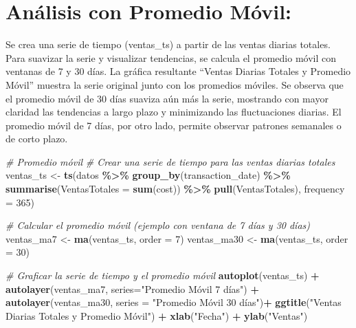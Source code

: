 \documentclass[
]{book}
\newenvironment{Shaded}{\begin{snugshade}}{\end{snugshade}}
\newcommand{\AttributeTok}[1]{\textcolor[rgb]{0.13,0.29,0.53}{#1}}
\newcommand{\CommentTok}[1]{\textcolor[rgb]{0.56,0.35,0.01}{\textit{#1}}}
\newcommand{\DecValTok}[1]{\textcolor[rgb]{0.00,0.00,0.81}{#1}}
\newcommand{\FunctionTok}[1]{\textcolor[rgb]{0.13,0.29,0.53}{\textbf{#1}}}
\newcommand{\NormalTok}[1]{#1}
\newcommand{\OtherTok}[1]{\textcolor[rgb]{0.56,0.35,0.01}{#1}}
\newcommand{\SpecialCharTok}[1]{\textcolor[rgb]{0.81,0.36,0.00}{\textbf{#1}}}
\newcommand{\StringTok}[1]{\textcolor[rgb]{0.31,0.60,0.02}{#1}}
\begin{document}
\section{Análisis con Promedio Móvil:}\label{anuxe1lisis-con-promedio-muxf3vil}

Se crea una serie de tiempo (ventas\_ts) a partir de las ventas diarias totales. Para suavizar la serie y visualizar tendencias, se calcula el promedio móvil con ventanas de 7 y 30 días. La gráfica resultante ``Ventas Diarias Totales y Promedio Móvil'' muestra la serie original junto con los promedios móviles. Se observa que el promedio móvil de 30 días suaviza aún más la serie, mostrando con mayor claridad las tendencias a largo plazo y minimizando las fluctuaciones diarias. El promedio móvil de 7 días, por otro lado, permite observar patrones semanales o de corto plazo.

\begin{Shaded}
\begin{Highlighting}[]
\CommentTok{\# Promedio móvil}
\CommentTok{\# Crear una serie de tiempo para las ventas diarias totales}
\NormalTok{ventas\_ts }\OtherTok{\textless{}{-}} \FunctionTok{ts}\NormalTok{(datos }\SpecialCharTok{\%\textgreater{}\%} \FunctionTok{group\_by}\NormalTok{(transaction\_date) }\SpecialCharTok{\%\textgreater{}\%} \FunctionTok{summarise}\NormalTok{(}\AttributeTok{VentasTotales =} \FunctionTok{sum}\NormalTok{(cost)) }\SpecialCharTok{\%\textgreater{}\%} \FunctionTok{pull}\NormalTok{(VentasTotales), }\AttributeTok{frequency =} \DecValTok{365}\NormalTok{)}


\CommentTok{\# Calcular el promedio móvil (ejemplo con ventana de 7 días y 30 días)}
\NormalTok{ventas\_ma7 }\OtherTok{\textless{}{-}} \FunctionTok{ma}\NormalTok{(ventas\_ts, }\AttributeTok{order =} \DecValTok{7}\NormalTok{)}
\NormalTok{ventas\_ma30 }\OtherTok{\textless{}{-}} \FunctionTok{ma}\NormalTok{(ventas\_ts, }\AttributeTok{order =} \DecValTok{30}\NormalTok{)}


\CommentTok{\# Graficar la serie de tiempo y el promedio móvil}
\FunctionTok{autoplot}\NormalTok{(ventas\_ts) }\SpecialCharTok{+}
  \FunctionTok{autolayer}\NormalTok{(ventas\_ma7, }\AttributeTok{series=}\StringTok{"Promedio Móvil 7 días"}\NormalTok{) }\SpecialCharTok{+}
  \FunctionTok{autolayer}\NormalTok{(ventas\_ma30, }\AttributeTok{series =} \StringTok{"Promedio Móvil 30 días"}\NormalTok{)}\SpecialCharTok{+}
  \FunctionTok{ggtitle}\NormalTok{(}\StringTok{"Ventas Diarias Totales y Promedio Móvil"}\NormalTok{) }\SpecialCharTok{+}
  \FunctionTok{xlab}\NormalTok{(}\StringTok{"Fecha"}\NormalTok{) }\SpecialCharTok{+} \FunctionTok{ylab}\NormalTok{(}\StringTok{"Ventas"}\NormalTok{)}
\end{Highlighting}
\end{Shaded}
\end{document}
